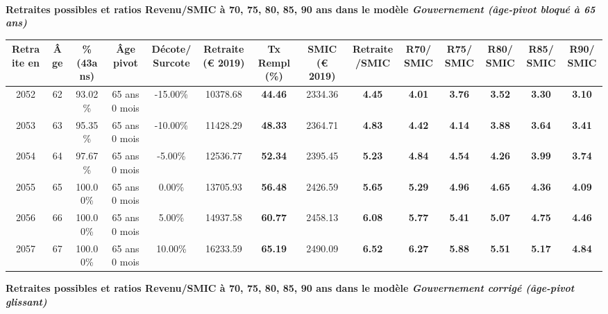  ~\\{\bf \noindent Retraites possibles et ratios Revenu/SMIC à 70, 75, 80, 85, 90 ans dans le modèle \emph{Gouvernement (âge-pivot bloqué à 65 ans)}}  
 
\begin{adjustbox}{max width=\textwidth} 
\begin{tabular}[htb]{|c|c||c|c|c||c|c||c|c||c|c|c|c|c|} 
\hline 
 Retraite en &  Âge &  \%(43ans) &  Âge pivot &  Décote/Surcote &  Retraite (\euro{} 2019) &  Tx Rempl(\%) &  SMIC (\euro{} 2019) &  Retraite/SMIC &  R70/SMIC &  R75/SMIC &  R80/SMIC &  R85/SMIC &  R90/SMIC \\ 
\hline \hline 
 2052 &  62 &  93.02\% &  65 ans 0 mois &  -15.00\% &  10378.68 &  {\bf 44.46} &  2334.36 &  {\bf 4.45} &  {\bf 4.01} &  {\bf 3.76} &  {\bf 3.52} &  {\bf 3.30} &  {\bf 3.10} \\ 
\hline 
 2053 &  63 &  95.35\% &  65 ans 0 mois &  -10.00\% &  11428.29 &  {\bf 48.33} &  2364.71 &  {\bf 4.83} &  {\bf 4.42} &  {\bf 4.14} &  {\bf 3.88} &  {\bf 3.64} &  {\bf 3.41} \\ 
\hline 
 2054 &  64 &  97.67\% &  65 ans 0 mois &  -5.00\% &  12536.77 &  {\bf 52.34} &  2395.45 &  {\bf 5.23} &  {\bf 4.84} &  {\bf 4.54} &  {\bf 4.26} &  {\bf 3.99} &  {\bf 3.74} \\ 
\hline 
 2055 &  65 &  100.00\% &  65 ans 0 mois &  0.00\% &  13705.93 &  {\bf 56.48} &  2426.59 &  {\bf 5.65} &  {\bf 5.29} &  {\bf 4.96} &  {\bf 4.65} &  {\bf 4.36} &  {\bf 4.09} \\ 
\hline 
 2056 &  66 &  100.00\% &  65 ans 0 mois &  5.00\% &  14937.58 &  {\bf 60.77} &  2458.13 &  {\bf 6.08} &  {\bf 5.77} &  {\bf 5.41} &  {\bf 5.07} &  {\bf 4.75} &  {\bf 4.46} \\ 
\hline 
 2057 &  67 &  100.00\% &  65 ans 0 mois &  10.00\% &  16233.59 &  {\bf 65.19} &  2490.09 &  {\bf 6.52} &  {\bf 6.27} &  {\bf 5.88} &  {\bf 5.51} &  {\bf 5.17} &  {\bf 4.84} \\ 
\hline 
\hline 
\end{tabular} 
\end{adjustbox} 
 
 \vspace{0.1cm} 
{\bf \noindent Retraites possibles et ratios Revenu/SMIC à 70, 75, 80, 85, 90 ans dans le modèle \emph{Gouvernement corrigé (âge-pivot glissant)}}  
 
